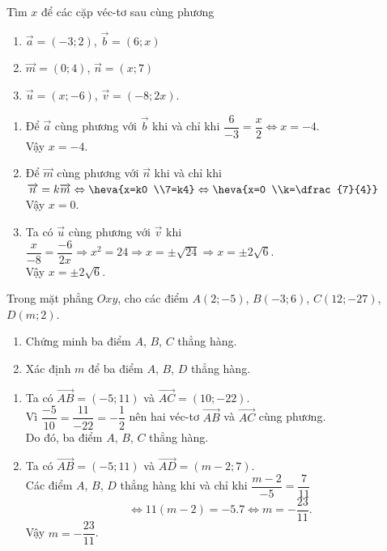 \begin{bt}%
Tìm $x$ để các cặp véc-tơ sau cùng phương
\begin{enumerate}
\item $\overrightarrow{a}=(-3;2)$, $\overrightarrow{b}=(6;x)$
\item $\overrightarrow{m}=(0;4)$, $\overrightarrow{n}=(x;7)$
\item $\overrightarrow{u}=(x;-6)$, $\overrightarrow{v}=(-8;2x)$.
\end{enumerate}
\loigiai
{\begin{enumerate}
\item Để $\overrightarrow{a}$ cùng phương với $\overrightarrow{b}$ khi và chỉ khi $\dfrac{6}{-3}=\dfrac{x}{2} \Leftrightarrow x=-4$.\\
Vậy $x=-4$.
\item Để $\overrightarrow{m}$ cùng phương với $\overrightarrow{n}$ khi và chỉ khi $\overrightarrow{n}=k\overrightarrow{m} \Leftrightarrow \heva{x=k0 \\7=k4} \Leftrightarrow \heva{x=0 \\k=\dfrac{7}{4}}$\\
Vậy $x=0$.
\item Ta có $\overrightarrow{u}$ cùng phương với $\overrightarrow{v}$ khi $\dfrac{x}{-8}=\dfrac{-6}{2x} \Rightarrow x^2=24 \Rightarrow x=\pm \sqrt{24} \Rightarrow x=\pm 2\sqrt{6}$.\\
Vậy $x=\pm 2\sqrt{6}$.
\end{enumerate}}
\end{bt}

\begin{bt}%
Trong mặt phẳng $Oxy$, cho các điểm $A(2;-5)$, $B(-3;6)$, $C(12;-27)$, $D(m;2)$.
\begin{enumerate}
\item Chứng minh ba điểm $A$, $B$, $C$ thẳng hàng.
\item Xác định $m$ để ba điểm $A$, $B$, $D$ thẳng hàng.
\end{enumerate}
\loigiai
{\begin{enumerate}
\item Ta có $\overrightarrow{AB}=(-5;11)$ và $\overrightarrow{AC}=(10;-22)$.\\
Vì $\dfrac{-5}{10} = \dfrac{11}{-22} = -\dfrac{1}{2}$ nên hai véc-tơ $\overrightarrow{AB}$ và $\overrightarrow{AC}$ cùng phương.\\ 
Do đó, ba điểm $A$, $B$, $C$ thẳng hàng.
\item Ta có $\overrightarrow{AB}=(-5;11)$ và $\overrightarrow{AD}=(m-2;7)$.\\
Các điểm $A$, $B$, $D$ thẳng hàng khi và chỉ khi $\dfrac{m-2}{-5}=\dfrac{7}{11}$ 
$$\Leftrightarrow 11(m-2)=-5.7 \Leftrightarrow m=-\dfrac{23}{11}.$$
Vậy $m=-\dfrac{23}{11}$.
\end{enumerate}}
\end{bt}

